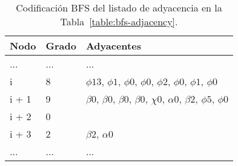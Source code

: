  \begin{table}%
\caption{Codificación BFS del listado de adyacencia en la Tabla~\ref{table:bfs-adjacency}.}
\label{table:bfs-coded}
\centering
\footnotesize

\begin{tabular}{|l|l|l|}
	\toprule
	Nodo & Grado & Adyacentes \\
	\midrule
	... & ... & ... \\
	i & 8 & $\phi13$, $\phi1$, $\phi0$, $\phi0$, $\phi2$, $\phi0$, $\phi1$, $\phi0$ \\
	i + 1 & 9 & $\beta0$, $\beta0$, $\beta0$, $\beta0$, $\chi0$, $\alpha0$, $\beta2$, $\phi5$, $\phi0$ \\
	i + 2 & 0 &  \\
	i + 3 & 2 & $\beta2$, $\alpha0$ \\
	... & ... & ... \\
\end{tabular}
\end{table} 
